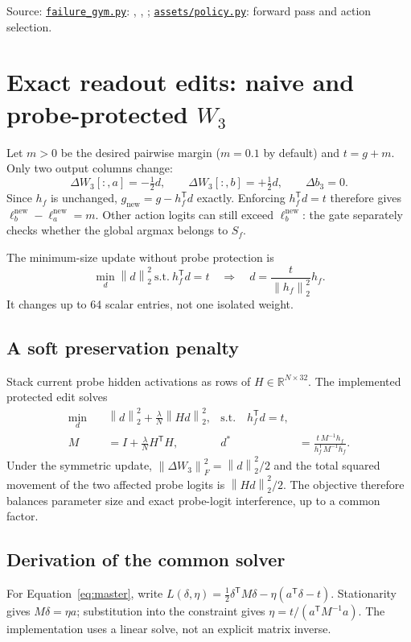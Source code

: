 \documentclass[11pt]{article}
\newcommand{\R}{\mathbb{R}}
\newcommand{\norm}[1]{\left\lVert#1\right\rVert}
\newcommand{\code}[1]{\texttt{\detokenize{#1}}}
\newcommand{\source}[2]{\href{https://github.com/HarleyCoops/KimiBrainSurgery/blob/13cfaec9f484a1a8864349a814bfd62905022a05/#1}{\nolinkurl{#1}}: #2}
\begin{document}
\small Source: \source{failure_gym.py}{\code{mine}, \code{flight_landing}, \code{diagnose}};
\source{assets/policy.py}{forward pass and action selection}.

\clearpage
\normalsize
\section{Exact readout edits: naive and probe-protected \texorpdfstring{$W_3$}{W3}}
Let $m>0$ be the desired pairwise margin ($m=0.1$ by default) and $t=g+m$.
Only two output columns change:
\begin{equation}
 \Delta W_3[:,a]=-\tfrac12d,\qquad
 \Delta W_3[:,b]=+\tfrac12d,\qquad \Delta b_3=0.
 \label{eq:w3columns}
\end{equation}
Since $h_f$ is unchanged, $g_{\mathrm{new}}=g-h_f^{\mathsf T}d$ exactly.
Enforcing $h_f^{\mathsf T}d=t$ therefore gives
$\ell_b^{\mathrm{new}}-\ell_a^{\mathrm{new}}=m$.
Other action logits can still exceed $\ell_b^{\mathrm{new}}$: the gate separately
checks whether the global argmax belongs to $S_f$.

The minimum-size update without probe protection is
\begin{equation}
 \min_d\norm{d}_2^2\ \text{s.t.}\ h_f^{\mathsf T}d=t
 \quad\Longrightarrow\quad d=\frac{t}{\norm{h_f}_2^2}h_f.
\end{equation}
It changes up to 64 scalar entries, not one isolated weight.

\subsection*{A soft preservation penalty}
Stack current probe hidden activations as rows of $H\in\R^{N\times32}$.
The implemented protected edit solves
\begin{align}
 \min_d\quad &\norm{d}_2^2+\frac{\lambda}{N}\norm{Hd}_2^2,
 &\text{s.t.}\quad h_f^{\mathsf T}d=t,\nonumber\\
 M&=I+\frac{\lambda}{N}H^{\mathsf T}H,
 &d^*&=\frac{t\,M^{-1}h_f}{h_f^{\mathsf T}M^{-1}h_f}.
 \label{eq:w3}
\end{align}
Under the symmetric update, $\norm{\Delta W_3}_F^2=\norm{d}_2^2/2$ and
the total squared movement of the two affected probe logits is
$\norm{Hd}_2^2/2$. The objective therefore balances parameter size and exact
probe-logit interference, up to a common factor.

\subsection*{Derivation of the common solver}
For Equation~\eqref{eq:master}, write
$L(\delta,\eta)=\tfrac12\delta^{\mathsf T}M\delta
-\eta(a^{\mathsf T}\delta-t)$.
Stationarity gives $M\delta=\eta a$; substitution into the constraint gives
$\eta=t/(a^{\mathsf T}M^{-1}a)$. The implementation uses a linear solve,
not an explicit matrix inverse.
\end{document}
